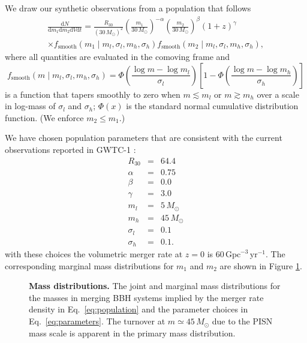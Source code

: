 \documentclass[modern]{aastex62}
\newcommand{\dd}{\mathrm{d}}
\newcommand{\diff}[2]{\frac{\dd #1}{\dd #2}}
\newcommand{\fsm}{f_{\mathrm{smooth}}}
\newcommand{\MPISN}{45 \, \MSun{}}
\newcommand{\MSun}{M_\odot}
\newcommand{\perGpcyr}{\mathrm{Gpc}^{-3} \, \mathrm{yr}^{-1}}
\begin{document}
We draw our synthetic observations from a population that follows
%
\begin{multline}
  \label{eq:population}
  \diff{N}{m_1 \dd m_2 \dd V \dd t} = \frac{R_{30}}{\left( 30 \, \MSun \right)^2} \left( \frac{m_1}{30 \, \MSun} \right)^{-\alpha} \left( \frac{m_2}{30 \, \MSun} \right)^{\beta} \left( 1 + z \right)^{\gamma} \\ \times \fsm\left( m_1 \mid m_l, \sigma_l, m_h, \sigma_h \right) \fsm\left( m_2 \mid m_l, \sigma_l, m_h, \sigma_h \right),
\end{multline}
%
where all quantities are evaluated in the comoving frame and
%
\begin{equation}
  \label{eq:smooth}
  \fsm\left( m \mid m_l, \sigma_l, m_h, \sigma_h \right) = \Phi\left( \frac{\log m - \log m_l}{\sigma_l} \right) \left[ 1 - \Phi\left( \frac{\log m - \log m_h}{\sigma_h} \right) \right]
\end{equation}
%
is a function that tapers smoothly to zero when $m \lesssim m_l$ or $m \gtrsim
m_h$ over a scale in log-mass of $\sigma_l$ and $\sigma_h$; $\Phi(x)$ is the
standard normal cumulative distribution function.  (We enforce $m_2 \leq m_1$.)

We have chosen population parameters that are consistent with the current
observations reported in GWTC-1 \citep{GWTC-1,O1O2Population}:
%
\begin{eqnarray}
  \label{eq:parameters}
  R_{30} & = & 64.4 \\
  \alpha & = & 0.75 \\
  \beta & = & 0.0 \\
  \gamma & = & 3.0 \\
  m_l & = & 5 \, \MSun \\
  m_h & = & 45 \, \MSun \\
  \sigma_l & = & 0.1 \\
  \sigma_h & = & 0.1.
\end{eqnarray}
%
with these choices the volumetric merger rate at $z = 0$ is $60 \, \perGpcyr$.
The corresponding marginal mass distributions for $m_1$ and $m_2$ are shown in
Figure \ref{fig:marginal-masses}.

\begin{figure}
%
  \caption{\label{fig:marginal-masses} \textbf{Mass distributions.} The joint
  and  marginal mass distributions for the masses in merging \ac{BBH} systems
  implied by the merger rate density in Eq.\ \eqref{eq:population} and the
  parameter choices in Eq.\ \eqref{eq:parameters}. The turnover at $m \simeq
  \MPISN{}$ due to the \ac{PISN} mass scale is apparent in the primary mass
  distribution.}
%
\end{figure}
\end{document}
